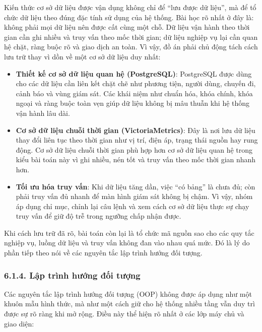 \documentclass[a4paper]{extarticle}
\providecommand{\tightlist}{%
  \setlength{\itemsep}{0pt}\setlength{\parskip}{0pt}}
\begin{document}
Kiến thức cơ sở dữ liệu được vận dụng không chỉ để ``lưu được dữ liệu'',
mà để tổ chức dữ liệu theo đúng đặc tính sử dụng của hệ thống. Bài học
rõ nhất ở đây là: không phải mọi dữ liệu nên được cất cùng một chỗ.
Dữ liệu vận hành theo thời gian cần ghi nhiều và truy vấn theo mốc thời
gian; dữ liệu nghiệp vụ lại
cần quan hệ chặt, ràng buộc rõ và giao dịch an toàn. Vì vậy, đồ án phải
chủ động tách cách lưu trữ thay vì dồn về một cơ sở dữ liệu duy nhất:
\begin{itemize}
\tightlist
\item
  \textbf{Thiết kế cơ sở dữ liệu quan hệ (PostgreSQL)}: PostgreSQL được
  dùng cho các dữ liệu cần liên kết chặt chẽ như phương tiện, người
  dùng, chuyến đi, cảnh báo và vùng giám sát. Các khái niệm như chuẩn
  hóa, khóa chính, khóa ngoại và ràng buộc toàn vẹn giúp dữ liệu không
  bị mâu thuẫn khi hệ thống vận hành lâu dài.
\item
  \textbf{Cơ sở dữ liệu chuỗi thời gian (VictoriaMetrics)}: Đây là nơi
  lưu dữ liệu thay đổi liên tục theo thời gian như vị trí, điện áp,
  trạng thái nguồn hay rung động. Cơ sở dữ liệu chuỗi thời gian phù hợp
  hơn cơ sở dữ liệu quan hệ trong kiểu bài toán này vì ghi nhiều, nén
  tốt và truy vấn theo mốc thời gian nhanh hơn.
\item
  \textbf{Tối ưu hóa truy vấn}: Khi dữ liệu tăng dần, việc ``có bảng''
  là chưa đủ; còn phải truy vấn đủ nhanh để màn hình giám sát không bị chậm.
  Vì vậy, nhóm áp dụng chỉ mục, chỉnh lại câu lệnh và xem cách cơ sở dữ
  liệu thực sự chạy truy vấn để giữ độ trễ trong ngưỡng chấp nhận được.
\end{itemize}

Khi cách lưu trữ đã rõ, bài toán còn lại là tổ chức mã nguồn sao cho các
quy tắc nghiệp vụ, luồng dữ liệu và truy vấn không đan vào nhau quá mức.
Đó là lý do phần tiếp theo nói về các nguyên tắc lập trình hướng đối
tượng.

\subsubsection{6.1.4. Lập trình hướng đối
tượng}\label{614-lux1eadp-truxecnh-hux1b0ux1edbng-ux111ux1ed1i-tux1b0ux1ee3ng}

Các nguyên tắc lập trình hướng đối tượng (OOP) không được áp dụng như
một khuôn mẫu hình thức, mà như một cách giữ cho hệ thống nhiều tầng vẫn
duy trì được sự rõ ràng khi mở rộng. Điều này thể hiện rõ nhất ở các lớp
máy chủ và giao diện:
\end{document}
